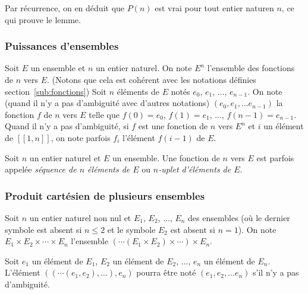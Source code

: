     Par récurrence, on en déduit que $P(n)$ est vrai pour tout entier naturen $n$, ce qui prouve le lemme.

   \done 

\subsubsection{Puissances d'ensembles}

Soit $E$ un ensemble et $n$ un entier naturel. 
On note $E^n$ l'ensemble des fonctions de $n$ vers $E$. 
(Notons que cela est cohérent avec les notations définies section~\ref{sub:fonctions})
Soit $n$ éléments de $E$ notés $e_0$, $e_1$, ..., $e_{n-1}$. 
On note (quand il n'y a pas d'ambiguité avec d'autres notations) $\left( e_0, e_1, \dots e_{n-1} \right)$ la fonction $f$ de $n$ vers $E$ telle que $f(0) = e_0$, $f(1) = e_1$, ..., $f(n-1) = e_{n-1}$. 
Quand il n'y a pas d'ambiguité, si $f$ est une fonction de $n$ vers $E^{n}$ et $i$ un élément de $[\![1,n]\!]$, on note parfois $f_i$ l'élément $f(i-1)$ de $E$.

Soit $n$ un entier naturel et $E$ un ensemble. 
Une fonction de $n$ vers $E$ est parfois appelée \textit{séquence de $n$ éléments de $E$} ou \textit{$n$-uplet d'éléments de $E$}.

\subsubsection{Produit cartésien de plusieurs ensembles}

Soit $n$ un entier naturel non nul et $E_1$, $E_2$, ..., $E_n$ des ensembles (où le dernier symbole est absent si $n \leq 2$ et le symbole $E_2$ est absent si $n = 1$). 
On note $E_1 \times E_2 \times \cdots \times E_n$ l'ensemble $( \cdots ( E_1 \times E_2 ) \times  \cdots ) \times E_n$.

Soit $e_1$ un élément de $E_1$, $E_2$ un élément de $E_2$, ..., $e_n$ un élément de $E_n$. 
L'élément $(( \cdots ( e_1, e_2 ), \dots ), e_n)$ pourra être noté $(e_1, e_2, \dots e_n)$ s'il n'y a pas d'ambiguité. 
